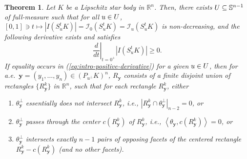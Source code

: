 \documentclass[11pt]{article}
\newtheorem{thm}{Theorem}[section]
\theoremstyle{definition}
\theoremstyle{proof}
\DeclareMathOperator{\+}{\mathop{\tilde{+}}}
\newcommand{\scalar}[1]{\left \langle #1 \right \rangle}
\newcommand{\R}{\mathbb{R}}
\renewcommand{\S}{\mathbb{S}}
\newcommand{\I}{\mathcal{I}}
\newcommand{\y}{\mathbf{y}}
\numberwithin{equation}{section}
\numberwithin{equation}{section}
\begin{document}
\begin{thm} \label{thm:intro-dIdt}
Let $K$ be a Lipschitz star body in $\R^n$. Then, there exists $\U \subseteq \S^{n-1}$ of full-measure such that for all $u \in U$, $[0,1] \ni t \mapsto |I (S_u^t K)| = \I_0(S_u^t K) = \I_u(S_u^t K)$ is non-decreasing, and the following derivative exists and satisfies
\begin{equation} \label{eq:intro-positive-derivative}
\left . \frac{d}{dt} \right |_{t=0^+} |I (S_u^t K)|  \geq 0 .
\end{equation}
 If equality occurs in (\ref{eq:intro-positive-derivative}) for a given $u \in U$, then for a.e.~$\y = (y_1,\ldots,y_n) \in (P_{u^{\perp}} K)^n$, $R_\y$ consists of a finite disjoint union of rectangles $\{R_\y^k\}$ in $\R^n$, such that for each rectangle $R_\y^k$, either
\begin{enumerate} 
\item \label{it:intro-cond1} $\theta_\y^{\perp}$ essentially does not intersect $R_\y^k$, i.e., $|R_\y^k \cap \theta_\y^{\perp}|_{n-2} = 0$, or  
\item \label{it:intro-cond2} $\theta_\y^{\perp}$ passes through the center $c(R_\y^k)$ of $R_\y^k$, i.e., $\scalar{\theta_\y , c(R_\y^k)} = 0$, or 
\item \label{it:intro-cond3} $\theta_\y^{\perp}$ intersects exactly $n-1$ pairs of opposing facets of the centered rectangle $R_\y^k - c(R_\y^k)$ (and no other facets).
\end{enumerate}
\end{thm}
\end{document}
